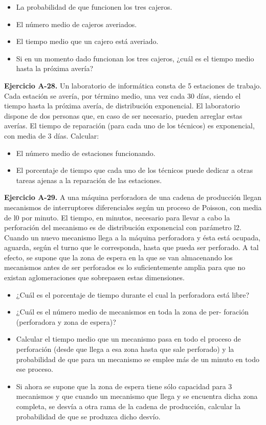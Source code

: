 \documentclass[
]{book}
\providecommand{\tightlist}{%
  \setlength{\itemsep}{0pt}\setlength{\parskip}{0pt}}
\theoremstyle{definition}
\theoremstyle{definition}
\theoremstyle{definition}
\theoremstyle{definition}
\theoremstyle{remark}
\begin{document}
\begin{itemize}
\tightlist
\item
  La probabilidad de que funcionen los tres cajeros.
\item
  El número medio de cajeros averiados.
\item
  El tiempo medio que un cajero está averiado.
\item
  Si en un momento dado funcionan los tres cajeros, ¿cuál es el tiempo medio hasta la próxima avería?
\end{itemize}

\textbf{Ejercicio A-28.} Un laboratorio de informática consta de 5 estaciones de trabajo. Cada estación se avería, por término medio, una vez cada 30 días, siendo el tiempo hasta la próxima avería, de distribución exponencial. El laboratorio dispone de dos personas que, en caso de ser necesario, pueden arreglar estas averías. El tiempo de reparación (para cada uno de los técnicos) es exponencial, con media de 3 días. Calcular:

\begin{itemize}
\tightlist
\item
  El número medio de estaciones funcionando.
\item
  El porcentaje de tiempo que cada uno de los técnicos puede dedicar a otras tareas ajenas a la reparación de las estaciones.
\end{itemize}

\textbf{Ejercicio A-29.} A una máquina perforadora de una cadena de producción llegan mecanismos de interruptores diferenciales según un proceso de Poisson, con media de l0 por minuto. El tiempo, en minutos, necesario para llevar a cabo la perforación del mecanismo es de distribución exponencial con parámetro l2. Cuando un nuevo mecanismo llega a la máquina perforadora y ésta está ocupada, aguarda, según el turno que le corresponda, hasta que pueda ser perforado. A tal efecto, se supone que la zona de espera en la que se van almacenando los mecanismos antes de ser perforados es lo suficientemente amplia para que no existan aglomeraciones que sobrepasen estas dimensiones.

\begin{itemize}
\tightlist
\item
  ¿Cuál es el porcentaje de tiempo durante el cual la perforadora está libre?
\item
  ¿Cuál es el número medio de mecanismos en toda la zona de per- foración (perforadora y zona de espera)?
\item
  Calcular el tiempo medio que un mecanismo pasa en todo el proceso de perforación (desde que llega a esa zona hasta que sale perforado) y la probabilidad de que para un mecanismo se emplee más de un minuto en todo ese proceso.
\item
  Si ahora se supone que la zona de espera tiene sólo capacidad para 3 mecanismos y que cuando un mecanismo que llega y se encuentra dicha zona completa, se desvía a otra rama de la cadena de producción, calcular la probabilidad de que se produzca dicho desvío.
\end{itemize}
\end{document}
